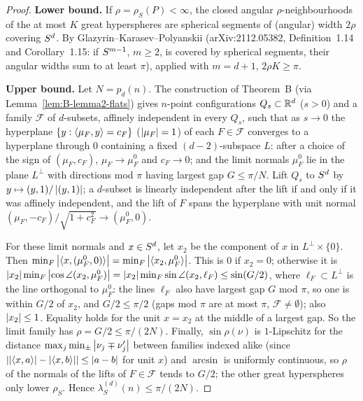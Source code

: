 \documentclass[11pt]{article}
\begin{document}
\begin{proof}
\textbf{Lower bound.} If $\rho=\rho_S(P)<\infty$, the closed angular $\rho$-neighbourhoods of the at most $K$
great hyperspheres are spherical segments of (angular) width $2\rho$ covering $S^d$. By Glazyrin--Karasev--Polyanskii
\cite{GKP} (arXiv:2112.05382, Definition~1.14 and Corollary~1.15: if $S^{m-1}$, $m\ge2$, is covered by spherical
segments, their angular widths sum to at least $\pi$), applied with $m=d+1$, $2\rho K\ge\pi$.

\textbf{Upper bound.} Let $N=p_d(n)$. The construction of Theorem~B (via Lemma~\ref{lem:B-lemma2-flats}) gives $n$-point
configurations $Q_s\subset\mathbb{R}^d$ ($s>0$) and a family $\mathcal F$ of $d$-subsets, affinely independent in
every $Q_s$, such that as $s\to0$ the hyperplane $\{y:\langle \mu_F,y\rangle=c_F\}$ ($\left|\mu_F\right|=1$) of each
$F\in\mathcal F$ converges to a hyperplane through $0$ containing a fixed $(d-2)$-subspace $L$: after a choice of
the sign of $(\mu_F,c_F)$, $\mu_F\to\mu_F^0$ and $c_F\to0$; and the limit normals $\mu_F^0$ lie in the plane $L^\perp$ with directions mod $\pi$
having largest gap $G\le\pi/N$. Lift $Q_s$ to $S^d$ by $y\mapsto(y,1)/\left|(y,1)\right|$; a $d$-subset is linearly
independent after the lift if and only if it was affinely independent, and the lift of $F$ spans the hyperplane with
unit normal $(\mu_F,-c_F)/\sqrt{1+c_F^2}\to(\mu_F^0,0)$.

For these limit normals and $x\in S^d$, let $x_2$ be the component of $x$ in $L^\perp\times\{0\}$. Then
$\min_F\left|\langle x,(\mu_F^0,0)\rangle\right|=\min_F\left|\langle x_2,\mu_F^0\rangle\right|$. This is $0$ if $x_2=0$; otherwise it is
$\left|x_2\right|\min_F\left|\cos\angle(x_2,\mu_F^0)\right|=\left|x_2\right|\min_F\sin\angle(x_2,\ell_F)\le\sin(G/2)$, where $\ell_F\subset L^\perp$ is
the line orthogonal to $\mu_F^0$: the lines $\ell_F$ also have largest gap $G$ mod $\pi$, so one is within $G/2$
of $x_2$, and $G/2\le\pi/2$ (gaps mod $\pi$ are at most $\pi$, $\mathcal F\ne\emptyset$); also $\left|x_2\right|\le1$. Equality holds
for the unit $x=x_2$ at the middle of a largest gap. So the limit family has $\rho=G/2\le\pi/(2N)$. Finally,
$\sin\rho(\nu)$ is $1$-Lipschitz for the distance $\max_j\min_\pm\left|\nu_j\mp\nu'_j\right|$ between families indexed alike
(since $\left|\left|\langle x,a\rangle\right|-\left|\langle x,b\rangle\right|\right|\le\left|a-b\right|$ for unit $x$) and $\arcsin$ is uniformly continuous,
so $\rho$ of the normals of the lifts of $F\in\mathcal F$ tends to $G/2$; the other great hyperspheres only
lower $\rho_S$. Hence $\lambda_S^{(d)}(n)\le\pi/(2N)$.
\end{proof}
\end{document}
